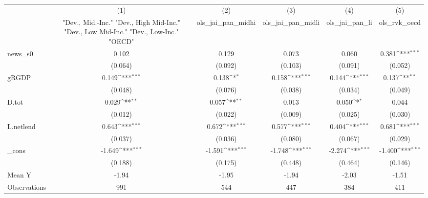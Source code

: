 {
\def\sym#1{\ifmmode^{#1}\else\(^{#1}\)\fi}
\begin{tabular}{l*{5}{c}}
\toprule
            &\multicolumn{1}{c}{(1)}&\multicolumn{1}{c}{(2)}&\multicolumn{1}{c}{(3)}&\multicolumn{1}{c}{(4)}&\multicolumn{1}{c}{(5)}\\
            &\multicolumn{1}{c}{ "Dev., Mid.-Inc." "Dev., High Mid-Inc." "Dev., Low Mid-Inc." "Dev., Low-Inc." "OECD" }&\multicolumn{1}{c}{ols\_jai\_pan\_midhi}&\multicolumn{1}{c}{ols\_jai\_pan\_midli}&\multicolumn{1}{c}{ols\_jai\_pan\_li}&\multicolumn{1}{c}{ols\_rvk\_oecd}\\
\midrule
news\_s0     &       0.102         &       0.129         &       0.073         &       0.060         &       0.381\sym{***}\\
            &     (0.064)         &     (0.092)         &     (0.103)         &     (0.091)         &     (0.052)         \\
\addlinespace
gRGDP       &       0.149\sym{***}&       0.138\sym{*}  &       0.158\sym{***}&       0.144\sym{***}&       0.137\sym{**} \\
            &     (0.048)         &     (0.076)         &     (0.038)         &     (0.034)         &     (0.049)         \\
\addlinespace
D.tot       &       0.029\sym{**} &       0.057\sym{**} &       0.013         &       0.050\sym{*}  &       0.044         \\
            &     (0.012)         &     (0.022)         &     (0.009)         &     (0.025)         &     (0.030)         \\
\addlinespace
L.netlend   &       0.643\sym{***}&       0.672\sym{***}&       0.577\sym{***}&       0.404\sym{***}&       0.681\sym{***}\\
            &     (0.037)         &     (0.036)         &     (0.080)         &     (0.067)         &     (0.029)         \\
\addlinespace
\_cons      &      -1.649\sym{***}&      -1.591\sym{***}&      -1.748\sym{***}&      -2.274\sym{***}&      -1.400\sym{***}\\
            &     (0.188)         &     (0.175)         &     (0.448)         &     (0.464)         &     (0.146)         \\
\midrule
Mean Y      &       -1.94         &       -1.95         &       -1.94         &       -2.03         &       -1.51         \\
Observations&         991         &         544         &         447         &         384         &         411         \\
\bottomrule
\end{tabular}
}
